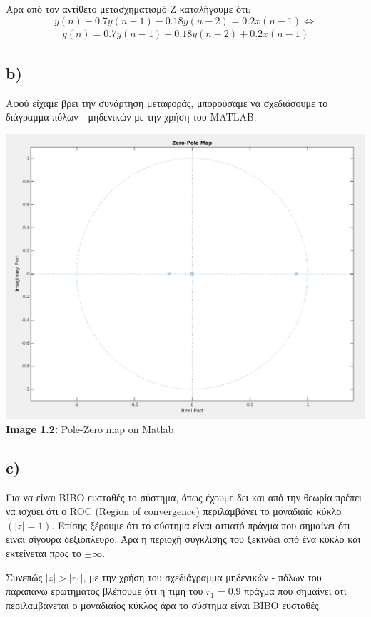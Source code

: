 \documentclass[11pt]{article}
\begin{document}
\par \noindent
Άρα από τον αντίθετο μετασχηματισμό Z καταλήγουμε ότι:
\[ y(n) - 0.7y(n-1) -0.18y(n-2) = 0.2x(n-1) \Leftrightarrow \]
\begin{align}
    \boxed{y(n) = 0.7y(n-1) + 0.18y(n-2) + 0.2x(n-1)}
\end{align}

\subsection*{b)}
Αφού είχαμε βρει την συνάρτηση μεταφοράς, μπορούσαμε να σχεδιάσουμε το διάγραμμα πόλων - μηδενικών με την χρήση του MATLAB.

\begin{center}{}
    \includegraphics[scale=0.35]{photos/Zero_Pole_Map.png}\\
    \textbf{Image 1.2:} Pole-Zero map on Matlab
\end{center}

\subsection*{c)} 
Για να είναι BIBO ευσταθές το σύστημα, όπως έχουμε δει και από την θεωρία πρέπει να ισχύει ότι ο ROC (Region of convergence) περιλαμβάνει το μοναδιαίο κύκλο $(|z|=1)$. Επίσης ξέρουμε ότι το σύστημα είναι αιτιατό πράγμα που σημαίνει ότι είναι σίγουρα δεξιόπλευρο. Άρα η περιοχή σύγκλισης του ξεκινάει από ένα κύκλο και εκτείνεται προς το $\pm \infty$. 
\par \noindent
Συνεπώς $|z|>|r_1|$, με την χρήση του σχεδιάγραμμα μηδενικών - πόλων του παραπάνω ερωτήματος βλέπουμε ότι η τιμή του $r_1=0.9$ πράγμα που σημαίνει ότι περιλαμβάνεται ο μοναδιαίος κύκλος άρα το σύστημα είναι BIBO ευσταθές.
\end{document}
